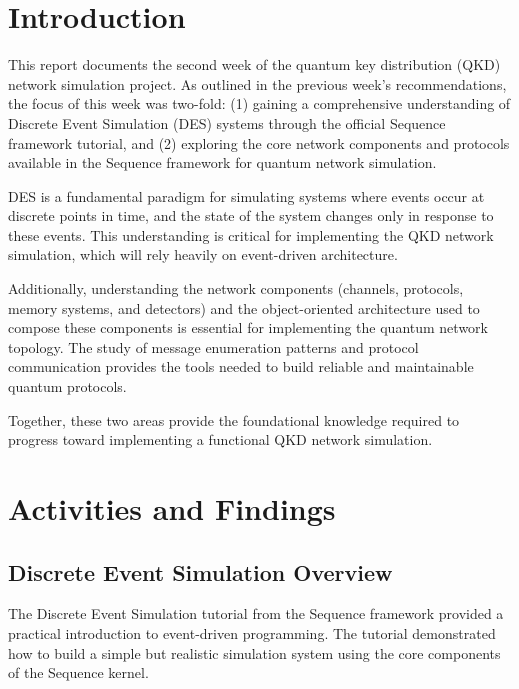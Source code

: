 \doublespacing
\thispagestyle{fancy}



\section{Introduction}

This report documents the second week of the quantum key distribution (QKD) network simulation project. As outlined in the previous week's recommendations, the focus of this week was two-fold: (1) gaining a comprehensive understanding of Discrete Event Simulation (DES) systems through the official Sequence framework tutorial, and (2) exploring the core network components and protocols available in the Sequence framework for quantum network simulation.

DES is a fundamental paradigm for simulating systems where events occur at discrete points in time, and the state of the system changes only in response to these events. This understanding is critical for implementing the QKD network simulation, which will rely heavily on event-driven architecture.

Additionally, understanding the network components (channels, protocols, memory systems, and detectors) and the object-oriented architecture used to compose these components is essential for implementing the quantum network topology. The study of message enumeration patterns and protocol communication provides the tools needed to build reliable and maintainable quantum protocols.

Together, these two areas provide the foundational knowledge required to progress toward implementing a functional QKD network simulation.

\section{Activities and Findings}

\subsection{Discrete Event Simulation Overview}

The Discrete Event Simulation tutorial from the Sequence framework provided a practical introduction to event-driven programming. The tutorial demonstrated how to build a simple but realistic simulation system using the core components of the Sequence kernel.

